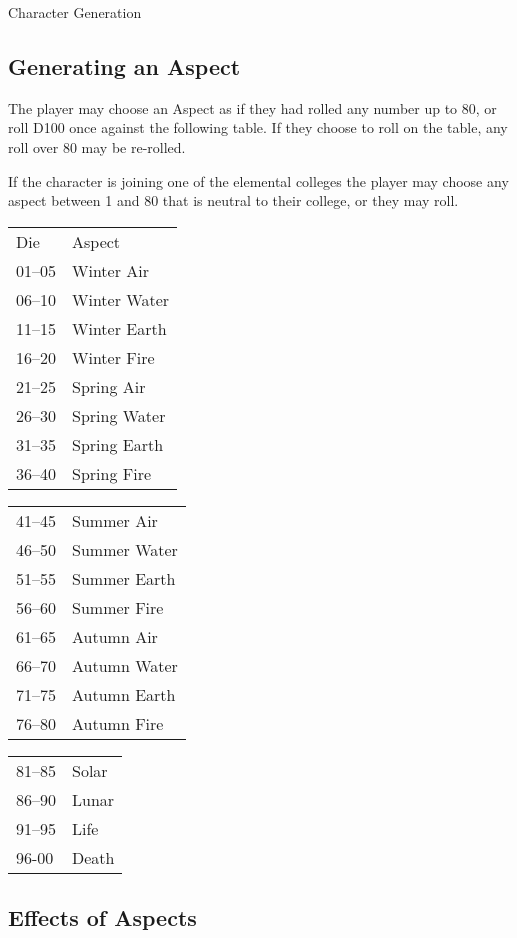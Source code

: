 \begin{Chapter}{Character Generation}
\subsection{Generating an Aspect}

The player may choose an Aspect as if they had rolled any number up to
80, or roll D100 once against the following table.  If they choose to
roll on the table, any roll over 80 may be re-rolled.

If the character is joining one of the elemental colleges the player
may choose any aspect between 1 and 80 that is neutral to their
college, or they may roll.

\begin{inline}
\begin{tabular}{m{6em}m{20em}}
Die	& Aspect  \\
01–05	& Winter Air  \\
06–10	& Winter Water  \\
11–15	& Winter Earth  \\
16–20	& Winter Fire  \\
21–25	& Spring Air  \\
26–30	& Spring Water  \\
31–35	& Spring Earth  \\
36–40	& Spring Fire  \\
\end{tabular}

\begin{tabular}{m{6em}m{20em}}
41–45	& Summer Air  \\
46–50	& Summer Water  \\
51–55	& Summer Earth  \\
56–60	& Summer Fire  \\
61–65	& Autumn Air  \\
66–70	& Autumn Water  \\
71–75	& Autumn Earth  \\
76–80	& Autumn Fire  \\
\end{tabular}

\begin{tabular}{m{6em}m{20em}}
81–85	& Solar  \\
86–90	& Lunar  \\
91–95	& Life  \\
96-00	& Death  \\
\end{tabular}
\end{inline}

\subsection{Effects of Aspects}


\end{Chapter}
